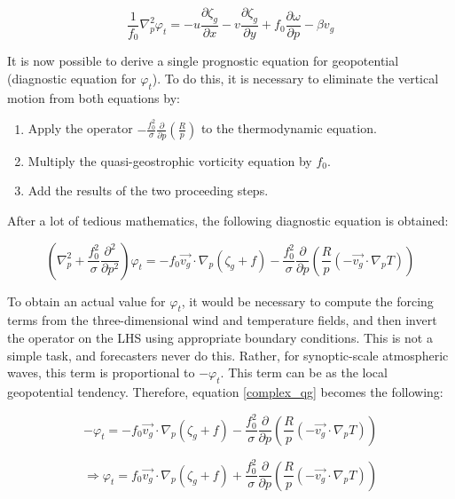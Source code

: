 \begin{equation}
    \frac{1}{f_0} \nabla^{2}_p \varphi_t = -u \frac{\partial \zeta_g}{\partial x} - v \frac{\partial \zeta_g}{\partial y} + f_0 \frac{\partial \omega}{\partial p} - \beta v_g
\end{equation}

It is now possible to derive a single prognostic equation for geopotential (diagnostic equation for $\varphi_t$)\cite{quasi_geo}. To do this, it is necessary to eliminate the vertical motion from both equations by:

\begin{enumerate}
    \item Apply the operator $-\frac{f^{2}_0}{\sigma} \frac{\partial}{\partial p} (\frac{R}{p})$ to the thermodynamic equation.
    \item Multiply the quasi-geostrophic vorticity equation by $f_0$.
    \item Add the results of the two proceeding steps.
\end{enumerate}

After a lot of tedious mathematics, the following diagnostic equation is obtained:

\begin{equation}
    (\nabla^2_p + \frac{f^2_0}{\sigma} \frac{\partial^2}{\partial p^2}) \varphi_t = - f_0 \Vec{v_g} \cdot \nabla_p (\zeta_g + f) - \frac{f^2_0}{\sigma} \frac{\partial}{\partial p} (\frac{R}{p} (-\Vec{v_g} \cdot \nabla_p T))
    \label{complex_qg}
\end{equation}

To obtain an actual value for $\varphi_t$, it would be necessary to compute the forcing terms from the three-dimensional wind and temperature fields, and then invert the operator on the LHS using appropriate boundary conditions. This is not a simple task, and forecasters never do this. Rather, for synoptic-scale atmospheric waves, this term is proportional to $-\varphi_t$. This term can be as the local geopotential tendency\cite{quasi_geo}. Therefore, equation \ref{complex_qg} becomes the following:

\begin{equation}
    - \varphi_t = - f_0 \Vec{v_g} \cdot \nabla_p (\zeta_g + f) - \frac{f^2_0}{\sigma} \frac{\partial}{\partial p} (\frac{R}{p} (-\Vec{v_g} \cdot \nabla_p T))
\end{equation}

\begin{equation}
    \Rightarrow \varphi_t = f_0 \Vec{v_g} \cdot \nabla_p (\zeta_g + f) + \frac{f^2_0}{\sigma} \frac{\partial}{\partial p} (\frac{R}{p} (-\Vec{v_g} \cdot \nabla_p T))
\end{equation}

